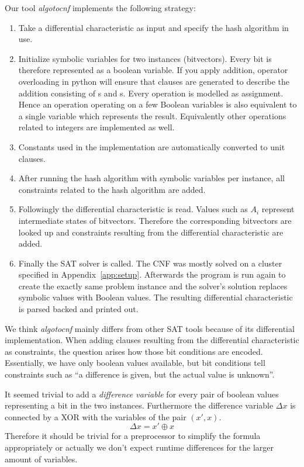 Our tool \emph{algotocnf} implements the following strategy:
\begin{enumerate}
  \item Take a differential characteristic as input and specify the hash algorithm in use.
  \item Initialize symbolic variables for two instances (bitvectors).
    Every bit is therefore represented as a boolean variable.
    If you apply addition, operator overloading in python will ensure
    that clauses are generated to describe the addition consisting of s and s.
    Every operation is modelled as assignment. Hence an operation operating on a few
    Boolean variables is also equivalent to a single variable which represents the result.
    Equivalently other operations related to integers are implemented as well.
  \item Constants used in the implementation are automatically converted to unit clauses.
  \item After running the hash algorithm with symbolic variables per instance,
    all constraints related to the hash algorithm are added.
  \item Followingly the differential characteristic is read. Values such as $A_i$
    represent intermediate states of bitvectors. Therefore the corresponding bitvectors
    are looked up and constraints resulting from the differential characteristic are
    added.
  \item Finally the SAT solver is called. The CNF was mostly solved on a cluster
    specified in Appendix~\ref{app:setup}. Afterwards the program is run again to
    create the exactly same problem instance and the solver's solution replaces
    symbolic values with Boolean values. The resulting differential characteristic
    is parsed backed and printed out.
\end{enumerate}

We think \emph{algotocnf} mainly differs from other SAT tools because of its
differential implementation. When adding clauses resulting from the differential
characteristic as constraints, the question arises how those bit conditions are
encoded. Essentially, we have only boolean values available, but bit conditions
tell constraints such as \enquote{a difference is given, but the actual value
is unknown}.

It seemed trivial to add a \emph{difference variable} for every pair of boolean
values representing a bit in the two instances. Furthermore the difference
variable $\Delta x$ is connected by a XOR with the variables of the pair $(x', x)$.
\[ \Delta x = x' \oplus x \]
Therefore it should be trivial for a preprocessor to simplify the formula
appropriately or actually we don't expect runtime differences for the larger
amount of variables.


